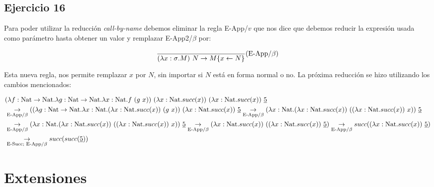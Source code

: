 \documentclass[10pt,a4paper, landscape]{article}
\begin{document}
\newpage

\subsection{Ejercicio 16}
\begin{multicols}{2}
Para poder utilizar la reducción \textit{call-by-name} debemos eliminar la regla E-App/$v$ que nos dice que debemos reducir la expresión usada como parámetro hasta obtener un valor y remplazar E-App2/$\beta$ por:
\vfil

$$\frac{}{(\lambda x: \sigma \text{.} M)~N \to M\{x\leftarrow N\}}(\text{E-App/}\beta)$$

Esta nueva regla, nos permite remplazar $x$ por $N$, sin importar si $N$ está en forma normal o no. La próxima reducción se hizo utilizando los cambios mencionados:
\end{multicols}

\begin{equation*}
\begin{split}
&(\lambda f: \text{Nat}\to\text{Nat} \text{.} \lambda g: \text{Nat}\to\text{Nat} \text{.} \lambda x: \text{Nat} \text{.} f~(g~x))~(\lambda x: \text{Nat} \text{.} succ(x))~(\lambda x: \text{Nat} \text{.} succ(x))~\underline{5} \\
&\underset{\text{E-App}/\beta}{\to} ((\lambda g: \text{Nat}\to\text{Nat} \text{.} \lambda x: \text{Nat} \text{.} (\lambda x: \text{Nat} \text{.} succ(x))~(g~x))~(\lambda x: \text{Nat} \text{.} succ(x))~\underline{5}
\underset{\text{E-App}/\beta}{\to} (\lambda x: \text{Nat} \text{.} (\lambda x: \text{Nat} \text{.} succ(x))~((\lambda x: \text{Nat} \text{.} succ(x))~x))~\underline{5}\\
&\underset{\text{E-App}/\beta}{\to} (\lambda x: \text{Nat} \text{.} (\lambda x: \text{Nat} \text{.} succ(x))~((\lambda x: \text{Nat} \text{.} succ(x))~x))~\underline{5} 
\underset{\text{E-App}/\beta}{\to} (\lambda x: \text{Nat} \text{.} succ(x))~((\lambda x: \text{Nat} \text{.} succ(x))~\underline{5})
\underset{\text{E-App}/\beta}{\to} succ((\lambda x: \text{Nat} \text{.} succ(x))~\underline{5}) \\
&\underset{\text{E-Succ; E-App}/\beta}{\to} succ(succ(\underline{5})) 
\end{split}
\end{equation*}

\newpage
\section*{\centering Extensiones}
\end{document}
